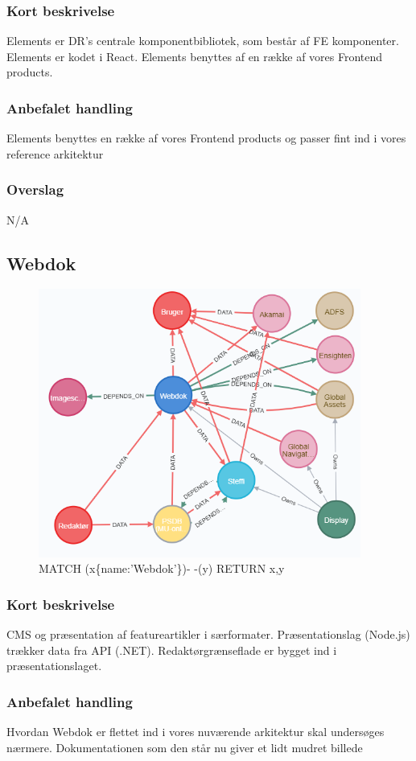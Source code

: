 \documentclass{article}
\begin{document}
\subsubsection{Kort beskrivelse}
Elements er DR's centrale komponentbibliotek, som består af FE komponenter. Elements er kodet i React. Elements benyttes af en række af vores Frontend products.
\subsubsection{Anbefalet handling}
Elements benyttes en række af vores Frontend products og passer fint ind i vores reference arkitektur
\subsubsection{Overslag}
N/A

\subsection{Webdok}
\begin{figure}[h]
\includegraphics[width=300pt]{Webdok.PNG}
\caption{MATCH (x\{name:'Webdok'\})- -(y) RETURN x,y}
\end{figure}
\subsubsection{Kort beskrivelse}
CMS og præsentation af featureartikler i særformater.	
Præsentationslag (Node.js) trækker data fra API (.NET). Redaktørgrænseflade er bygget ind i præsentationslaget.
\subsubsection{Anbefalet handling}
Hvordan Webdok er flettet ind i vores nuværende arkitektur skal undersøges nærmere. Dokumentationen som den står nu giver et lidt mudret billede
\end{document}
